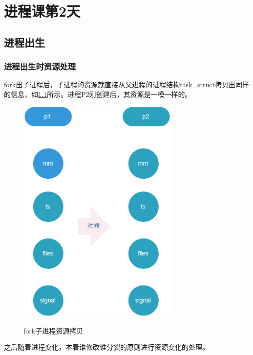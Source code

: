 
\part{进程课第2天}

\chapter{进程出生}
\section{进程出生时资源处理}
fork出子进程后，子进程的资源就直接从父进程的进程结构task\_struct拷贝出同样的信息，如\ref{child_fork_task_struct}所示。进程P2刚创建后，其资源是一模一样的。

\begin{figure}[H]
 \wdfigbox
  {\caption{fork子进程资源拷贝}\label{child_fork_task_struct}}
  {
  \includegraphics[width=8cm]{./figure/child_fork_task_struct.png}
  }
\end{figure}
之后随着进程变化，本着谁修改谁分裂的原则进行资源变化的处理。


